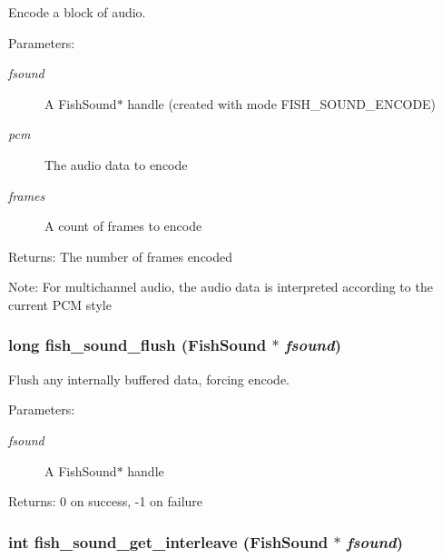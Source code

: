 Encode a block of audio. 

\begin{Desc}
\item[Parameters:]
\begin{description}
\item[{\em fsound}]A Fish\-Sound$\ast$ handle (created with mode FISH\_\-SOUND\_\-ENCODE) \item[{\em pcm}]The audio data to encode \item[{\em frames}]A count of frames to encode \end{description}
\end{Desc}
\begin{Desc}
\item[Returns:]The number of frames encoded \end{Desc}
\begin{Desc}
\item[Note:]For multichannel audio, the audio data is interpreted according to the current PCM style \end{Desc}
\subsubsection{\setlength{\rightskip}{0pt plus 5cm}long fish\_\-sound\_\-flush ({\bf Fish\-Sound} $\ast$ {\em fsound})}\label{fishsound_8h_a9}


Flush any internally buffered data, forcing encode. 

\begin{Desc}
\item[Parameters:]
\begin{description}
\item[{\em fsound}]A Fish\-Sound$\ast$ handle \end{description}
\end{Desc}
\begin{Desc}
\item[Returns:]0 on success, -1 on failure \end{Desc}
\subsubsection{\setlength{\rightskip}{0pt plus 5cm}int fish\_\-sound\_\-get\_\-interleave ({\bf Fish\-Sound} $\ast$ {\em fsound})}\label{fishsound_8h_a13}


